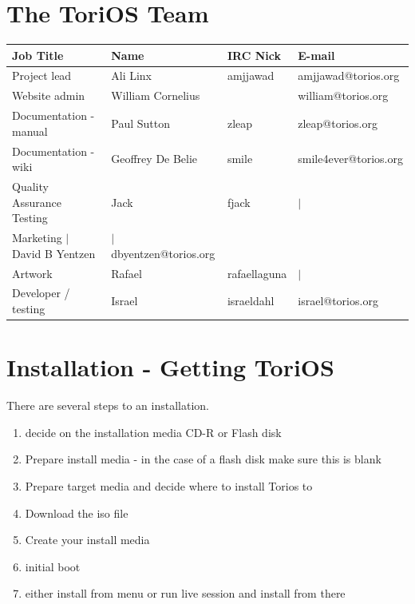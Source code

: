 \documentclass[12pt,a4paper]{book}
\begin{document}
\chapter{The ToriOS Team}
\begin{center}\begin{tabular}{|l|l|l|l|}
\hline \textbf{Job Title} & \textbf{Name} & \textbf{IRC Nick} & \textbf{E-mail} \\
\hline Project lead & Ali Linx & amjjawad & amjjawad@torios.org \\
\hline Website admin & William Cornelius &  & william@torios.org \\
\hline Documentation - manual & Paul Sutton & zleap	& zleap@torios.org \\
\hline Documentation - wiki & Geoffrey De Belie & smile & smile4ever@torios.org \\
\hline Quality Assurance Testing & Jack & fjack & $|$ \\
\hline Marketing $|$	David B Yentzen & $|$ dbyentzen@torios.org \\
\hline Artwork & Rafael & rafaellaguna & $|$ \\
\hline Developer / testing & Israel & israeldahl & israel@torios.org \\
\hline \end{tabular}\end{center}


\chapter{Installation - Getting ToriOS}
There are several steps to an installation. \\
\begin{enumerate}
\item decide on the installation media CD-R or Flash disk
\item Prepare install media - in the case of a flash disk make sure this is blank
\item Prepare target media and decide where to install Torios to
\item Download the iso file
\item Create your install media
\item initial boot
\item either install from menu or run live session and install from there


\end{enumerate}
\end{document}
